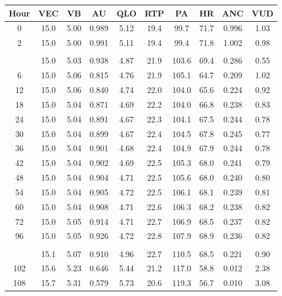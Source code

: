 \begin{table}
  \centering
  \begin{tabular}{cccccccccc}
    \toprule
    Hour & VEC & VB & AU & QLO & RTP & PA & HR & ANC & VUD \\
    \midrule
    0 & 15.0 & 5.00 & 0.989 & 5.12 & 19.4 & 99.7 & 71.7 & 0.996 & 1.03 \\
    2 & 15.0 & 5.00 & 0.991 & 5.11 & 19.4 & 99.4 & 71.8 & 1.002 & 0.98 \\
    \addlinespace[\paramchangeskip]
    \multicolumn{10}{c}{\textit{REK = 0.3}} \\
    \addlinespace[\paramchangeskip]
    3 & 15.0 & 5.03 & 0.938 & 4.87 & 21.9 & 103.6 & 69.4 & 0.286 & 0.55 \\
    6 & 15.0 & 5.06 & 0.815 & 4.76 & 21.9 & 105.1 & 64.7 & 0.209 & 1.02 \\
    12 & 15.0 & 5.06 & 0.840 & 4.74 & 22.0 & 104.0 & 65.6 & 0.224 & 0.92 \\
    18 & 15.0 & 5.04 & 0.871 & 4.69 & 22.2 & 104.0 & 66.8 & 0.238 & 0.83 \\
    24 & 15.0 & 5.04 & 0.891 & 4.67 & 22.3 & 104.1 & 67.5 & 0.244 & 0.78 \\
    30 & 15.0 & 5.04 & 0.899 & 4.67 & 22.4 & 104.5 & 67.8 & 0.245 & 0.77 \\
    36 & 15.0 & 5.04 & 0.901 & 4.68 & 22.4 & 104.9 & 67.9 & 0.244 & 0.78 \\
    42 & 15.0 & 5.04 & 0.902 & 4.69 & 22.5 & 105.3 & 68.0 & 0.241 & 0.79 \\
    48 & 15.0 & 5.04 & 0.904 & 4.71 & 22.5 & 105.6 & 68.0 & 0.240 & 0.80 \\
    54 & 15.0 & 5.04 & 0.905 & 4.72 & 22.5 & 106.1 & 68.1 & 0.239 & 0.81 \\
    60 & 15.0 & 5.04 & 0.908 & 4.71 & 22.6 & 106.3 & 68.2 & 0.238 & 0.82 \\
    72 & 15.0 & 5.05 & 0.914 & 4.71 & 22.7 & 106.9 & 68.5 & 0.237 & 0.82 \\
    96 & 15.0 & 5.05 & 0.926 & 4.72 & 22.8 & 107.9 & 68.9 & 0.236 & 0.82 \\
    \addlinespace[\paramchangeskip]
    \multicolumn{10}{c}{\textit{NID = 0.5}} \\
    \addlinespace[\paramchangeskip]
    97 & 15.1 & 5.07 & 0.910 & 4.96 & 22.7 & 110.5 & 68.5 & 0.221 & 0.90 \\
    102 & 15.6 & 5.23 & 0.646 & 5.44 & 21.2 & 117.0 & 58.8 & 0.012 & 2.38 \\
    108 & 15.7 & 5.31 & 0.579 & 5.73 & 20.6 & 119.3 & 56.7 & 0.010 & 3.08 \\

\end{tabular}
\end{table}
